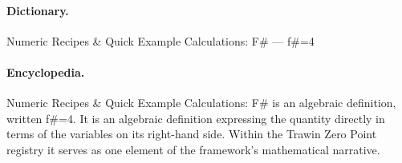 \paragraph{Dictionary.}
Numeric Recipes \& Quick Example Calculations: F\# — f\#=4

\paragraph{Encyclopedia.}
Numeric Recipes \& Quick Example Calculations: F\# is an algebraic definition, written f\#=4. It is an algebraic definition expressing the quantity directly in terms of the variables on its right-hand side. Within the Trawin Zero Point registry it serves as one element of the framework's mathematical narrative.
